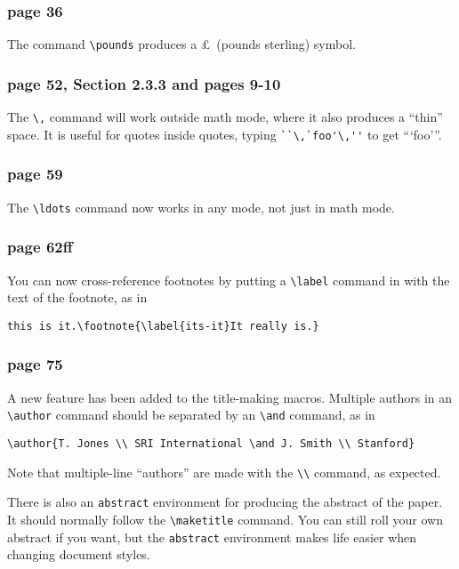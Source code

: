 \subsubsection*{page 36}
The command \hbox{\verb"\pounds"} produces a \pounds\ (pounds sterling)
symbol.


\subsubsection*{page 52, Section 2.3.3 and pages 9-10}
The \hbox{\verb|\,|} command will work outside math mode, where it also
produces a ``thin'' space.  It is useful for quotes inside quotes,
typing \hbox{\verb|``\,`foo'\,''|} to get ``\thinspace`foo'\thinspace''.

\subsubsection*{page 59}
The \hbox{\verb"\ldots"} command now works in any mode, not just in
math mode.

\subsubsection* {page 62ff}
You can now cross-reference footnotes by putting a \hbox{\verb"\label"}
command in with the text of the footnote, as in
\begin{verbatim}
this is it.\footnote{\label{its-it}It really is.}
\end{verbatim}

\subsubsection* {page 75}
A new feature has been added to the title-making macros.  Multiple
authors in an \hbox{\verb"\author"} command should be separated by
an \hbox{\verb"\and"} command, as in
\begin{verbatim}
\author{T. Jones \\ SRI International \and J. Smith \\ Stanford}
\end{verbatim}
Note that multiple-line ``authors'' are made with the \hbox{\verb"\\"}
command, as expected.

There is also an \hbox{\verb"abstract"} environment for producing the
abstract of the paper.  It should normally follow the
\hbox{\verb"\maketitle"} command.  You can still roll your own
abstract if you want, but the \hbox{\verb"abstract"} environment makes
life easier when changing document styles.

